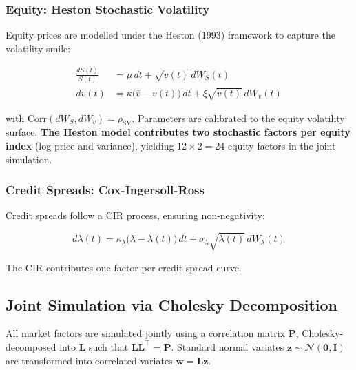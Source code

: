 \documentclass[11pt,a4paper]{article}
\begin{document}
\subsubsection{Equity: Heston Stochastic Volatility}

Equity prices are modelled under the Heston (1993) framework to capture the
volatility smile:

\begin{align}
  \frac{dS(t)}{S(t)} &= \mu\, dt + \sqrt{v(t)}\, dW_S(t) \label{eq:heston_s}\\
  dv(t) &= \kappa\bigl(\bar{v} - v(t)\bigr)\, dt + \xi\sqrt{v(t)}\, dW_v(t) \label{eq:heston_v}
\end{align}

with $\text{Corr}(dW_S, dW_v) = \rho_{\text{SV}}$. Parameters are calibrated
to the equity volatility surface. \textbf{The Heston model contributes two
stochastic factors per equity index} (log-price and variance), yielding
$12 \times 2 = 24$ equity factors in the joint simulation.

\subsubsection{Credit Spreads: Cox-Ingersoll-Ross}

Credit spreads follow a CIR process, ensuring non-negativity:

\begin{equation}
  d\lambda(t) = \kappa_\lambda\!\bigl(\bar{\lambda} - \lambda(t)\bigr)\, dt
               + \sigma_\lambda\sqrt{\lambda(t)}\, dW_\lambda(t)
  \label{eq:cir}
\end{equation}

The CIR contributes one factor per credit spread curve.

\subsection{Joint Simulation via Cholesky Decomposition}
\label{sec:cholesky}

All market factors are simulated jointly using a correlation matrix
$\mathbf{P}$, Cholesky-decomposed into $\mathbf{L}$ such that
$\mathbf{L}\mathbf{L}^\top = \mathbf{P}$. Standard normal variates
$\mathbf{z} \sim \mathcal{N}(\mathbf{0}, \mathbf{I})$ are transformed into
correlated variates $\mathbf{w} = \mathbf{L}\mathbf{z}$.
\end{document}
